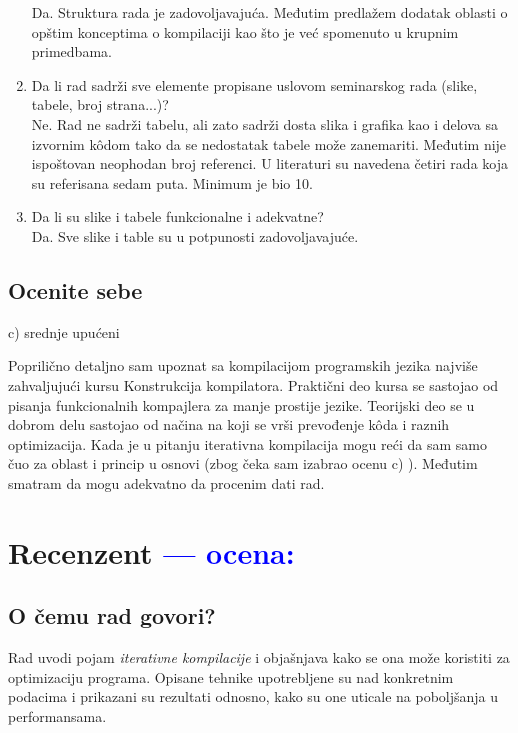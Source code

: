 \documentclass[a4paper]{report}
\newcommand{\odgovor}[1]{\textcolor{blue}{#1}}
\begin{document}
\begin{enumerate}
Da. Struktura rada je zadovoljavajuća. Međutim predlažem dodatak oblasti o opštim konceptima o kompilaciji kao što je već spomenuto u krupnim primedbama.
\item Da li rad sadrži sve elemente propisane uslovom seminarskog rada (slike, tabele, broj strana...)?\\
Ne. Rad ne sadrži tabelu, ali zato sadrži dosta slika i grafika kao i delova sa izvornim kôdom tako da se nedostatak tabele može zanemariti. Međutim nije ispoštovan neophodan broj referenci. U literaturi su navedena četiri rada koja su referisana sedam puta. Minimum je bio 10.
\item Da li su slike i tabele funkcionalne i adekvatne?\\
Da. Sve slike i table su u potpunosti zadovoljavajuće.
\end{enumerate}

\section{Ocenite sebe}
c) srednje upućeni

Poprilično detaljno sam upoznat sa kompilacijom programskih jezika najviše zahvaljujući kursu Konstrukcija kompilatora. Praktični deo kursa se sastojao od pisanja funkcionalnih kompajlera za manje prostije jezike. Teorijski deo se u dobrom delu sastojao od načina na koji se vrši prevođenje kôda i raznih optimizacija. Kada je u pitanju iterativna kompilacija mogu reći da sam samo čuo za oblast i princip u osnovi (zbog čeka sam izabrao ocenu c) ). Međutim smatram da mogu adekvatno da procenim dati rad.



\chapter{Recenzent \odgovor{--- ocena:} }


\section{O čemu rad govori?}

Rad uvodi pojam \textit{iterativne kompilacije} i objašnjava kako se ona može koristiti za optimizaciju programa. Opisane tehnike upotrebljene su nad konkretnim podacima i prikazani su rezultati odnosno, kako su one uticale na poboljšanja u performansama. 
\end{document}
